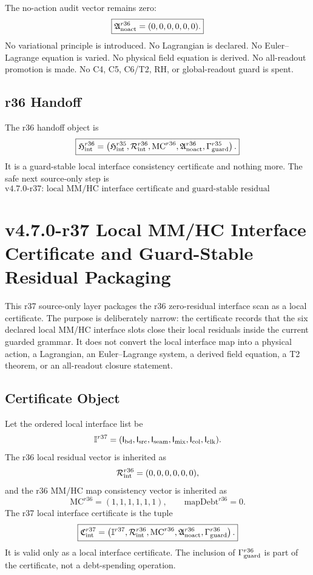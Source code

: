 The no-action audit vector remains zero:
\[
\boxed{
\mathfrak A_{\rm noact}^{r36}=(0,0,0,0,0,0).
}
\]
No variational principle is introduced.  No Lagrangian is declared.  No
Euler--Lagrange equation is varied.  No physical field equation is derived.  No
all-readout promotion is made.  No C4, C5, C6/T2, RH, or global-readout guard is
spent.

\subsection{r36 Handoff}
\label{subsec:r36-handoff}

The r36 handoff object is
\[
\boxed{
\mathfrak H_{\rm int}^{r36}
=
\left(
\mathfrak H_{\rm int}^{r35},
\mathcal R_{\rm int}^{r36},
\mathrm{MC}^{r36},
\mathfrak A_{\rm noact}^{r36},
\Gamma_{\rm guard}^{r35}
\right).
}
\]
It is a guard-stable local interface consistency certificate and nothing more.
The safe next source-only step is
\[
\boxed{
\text{v4.7.0-r37: local MM/HC interface certificate and guard-stable residual packaging.}
}
\]


\section{v4.7.0-r37 Local MM/HC Interface Certificate and Guard-Stable Residual Packaging}
\label{sec:r37-local-interface-certificate}

This r37 source-only layer packages the r36 zero-residual interface scan as a
local certificate.  The purpose is deliberately narrow: the certificate records
that the six declared local MM/HC interface slots close their local residuals
inside the current guarded grammar.  It does not convert the local interface
map into a physical action, a Lagrangian, an Euler--Lagrange system, a derived
field equation, a T2 theorem, or an all-readout closure statement.

\subsection{Certificate Object}
\label{subsec:r37-certificate-object}

Let the ordered local interface list be
\[
\mathbb I^{r37}
=
(\mathsf I_{\rm bd},\mathsf I_{\rm src},\mathsf I_{\rm seam},
 \mathsf I_{\rm mix},\mathsf I_{\rm col},\mathsf I_{\rm clk}).
\]
The r36 local residual vector is inherited as
\[
\mathcal R_{\rm int}^{r36}=(0,0,0,0,0,0),
\]
and the r36 MM/HC map consistency vector is inherited as
\[
\mathrm{MC}^{r36}=(1,1,1,1,1,1),
\qquad
\mathrm{mapDebt}^{r36}=0.
\]
The r37 local interface certificate is the tuple
\[
\boxed{
\mathfrak C_{\rm int}^{r37}
=
\left(
\mathbb I^{r37},
\mathcal R_{\rm int}^{r36},
\mathrm{MC}^{r36},
\mathfrak A_{\rm noact}^{r36},
\Gamma_{\rm guard}^{r36}
\right).
}
\]
It is valid only as a local interface certificate.  The inclusion of
\(\Gamma_{\rm guard}^{r36}\) is part of the certificate, not a debt-spending
operation.


